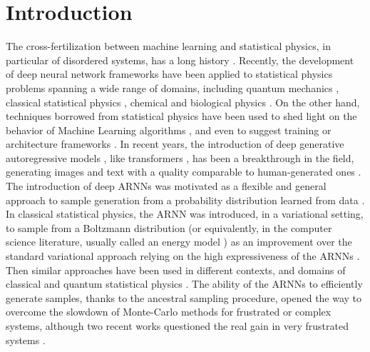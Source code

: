 \documentclass[aps,physrev,10pt,floatfix,reprint]{revtex4-2}
\begin{document}
\section{Introduction} 
The cross-fertilization between machine learning and statistical physics, in particular of disordered systems, has a long history \cite{doi:10.1073/pnas.79.8.2554, PhysRevA.32.1007}.
Recently, the development of deep neural network frameworks \cite{bengioNatureDeepLearning2015} have been applied to statistical physics problems \cite{RevModPhys.91.045002} spanning a wide range of domains, including quantum mechanics \cite{doi:10.1126/science.aag2302, Nieuwenburg2017}, 
classical statistical physics \cite{Carrasquilla2017, Wu2019}, chemical and biological physics \cite{noe2019boltzmann,jumper2021highly}.
On the other hand, techniques borrowed from statistical physics have been used to shed light on the behavior of Machine Learning algorithms \cite{doi:10.1080/00018732.2016.1211393, Nguyen2017}, and even to suggest training or architecture frameworks \cite{Chaudhari_2019, pmlr-v37-sohl-dickstein15}.
In recent years, the introduction of deep generative autoregressive models \cite{pmlr-v37-germain15, NIPS2016_b1301141}, like transformers \cite{NIPS2017_3f5ee243}, has been a breakthrough in the field, generating images and text with a quality comparable to human-generated ones \cite{https://doi.org/10.48550/arxiv.2005.14165}.  
The introduction of deep ARNNs was motivated as a flexible and general approach to sample generation from a probability distribution learned from data \cite{pmlr-v32-gregor14, pmlr-v15-larochelle11a, pmlr-v48-oord16}. 
In classical statistical physics, the ARNN was introduced, in a variational setting, to sample from a Boltzmann distribution (or equivalently, in the computer science literature, usually called an energy model \cite{pmlr-v97-durkan19a}) as an improvement over the standard variational approach relying on the high expressiveness of the ARNNs \cite{Wu2019}. 
 Then similar approaches have been used in different contexts, and domains of classical \cite{10.1103/physreve.101.023304,PhysRevE.101.053312,PhysRevE.103.012103,PhysRevResearch.3.L042024,10.1038/s42256-021-00401-3} and quantum statistical physics \cite{10.1103/physrevlett.128.090501,PhysRevA.102.062413,PhysRevLett.124.020503,PhysRevResearch.2.023358, Liu_2021, Barrett2022, Cha_2022}. The ability of the ARNNs to efficiently generate samples, thanks to the ancestral sampling procedure, opened the way to overcome the slowdown of Monte-Carlo methods for frustrated or complex systems, although two recent works questioned the real gain in very frustrated systems \cite{condmat7020038,https://doi.org/10.48550/arxiv.2210.11145}.
\end{document}
